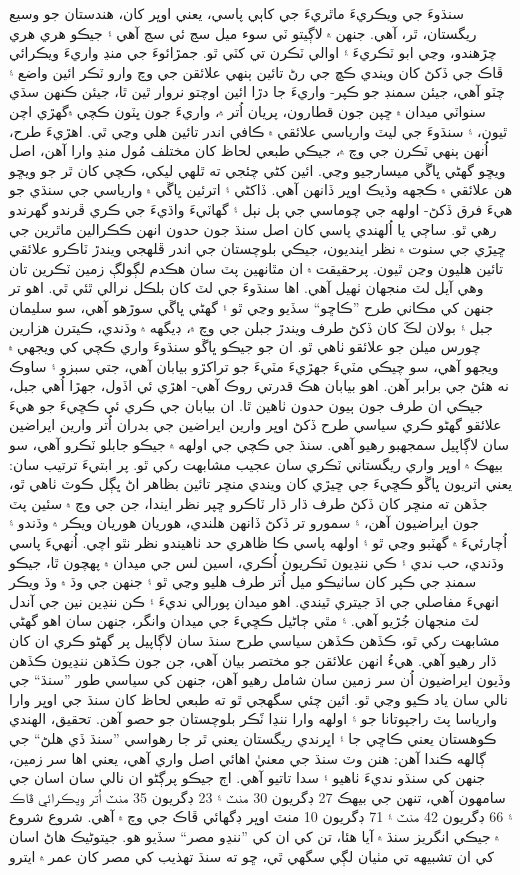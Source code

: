 \documentclass[a4paper]{article}
\begin{document}
\begin{flushright}
سنڌوءَ جي ويڪريءَ ماٿريءَ جي کاٻي پاسي، يعني اوڀر کان، هندستان جو وسيع ريگستان، ٿر، آهي. جنهن ۾ لاڳيتو ٽي سوء ميل سڃ ئي سڃ آهي ۽ جيڪو هري هري چڙهندو، وڃي ابو ٽڪريءَ ۽ اوالي ٽڪرن تي کٽي ٿو. جمڙائوءَ جي منڍ واريءَ ويڪرائي ڦاڪ جي ڏکڻ کان ويندي ڪڇ جي رڻ تائين ٻنهي علائقن جي وچ وارو ٽڪر ائين واضع ۽ چٽو آهي، جيئن سمنڊ جو ڪپر- واريءَ جا دڙا ائين اوچتو نروار ٿين ٿا، جيئن ڪنهن سڌي سنواٽي ميدان ۾ ڇپن جون قطارون، پريان اُتر ۾، واريءَ جون ڀٽون ڪچي ۾گهڙي اچن ٿيون، ۽ سنڌوءَ جي ليٽ وارياسي علائقي ۾ ڪافي اندر تائين هلي وڃي ٿي. اهڙيءَ طرح، اُنهن ٻنهي ٽڪرن جي وچ ۾، جيڪي طبعي لحاظ کان مختلف مُول منڍ وارا آهن، اصل ويڇو گهڻي ڀاڱي ميسارجيو وڃي. ائين کڻي چئجي ته ٿلهي ليکي، ڪچي کان ٿر جو ويڇو هن علائقي ۾ ڪجهه وڌيڪ اوڀر ڏانهن آهي. ڏاکڻي ۽ اترئين ڀاڱي ۾ وارياسي جي سنڌي جو هيءَ فرق ڏکڻ- اولهه جي چوماسي جي ٻل نٻل ۽ گهاٽيءَ واڌيءَ جي ڪري ڦرندو گهرندو رهي ٿو. ساڄي يا اُلهندي پاسي کان اصل سنڌ جون حدون انهن ڪڪرالين ماٿرين جي ڇيڙي جي سنوت ۾ نظر اينديون، جيڪي بلوچستان جي اندر ڦلهجي ويندڙ ٽاڪرو علائقي تائين هليون وڃن ٿيون. پرحقيقت ۾ ان مٿانهين پٽ سان هڪدم لڳولڳ زمين ٽڪرين تان وهي آيل لٽ منجهان ٺهيل آهي. اها سنڌوءَ جي لٽ کان بلڪل نرالي ٿئي ٿي. اهو تر جنهن کي مڪاني طرح ”ڪاڇو“ سڏيو وڃي ٿو ۽ گهڻي ڀاڱي سوڙهو آهي، سو سليمان جبل ۽ بولان لڪَ کان ڏکڻ طرف ويندڙ جبلن جي وچ ۾، ڊيگهه ۾ وڌندي، ڪيترن هزارين چورس ميلن جو علائقو ٺاهي ٿو. ان جو جيڪو ڀاڱو سنڌوءَ واري ڪچي کي ويجهي ۾ ويجهو آهي، سو چيڪي مٽيءَ جهڙيءَ مٽيءَ جو تراکڙو بيابان آهي، جتي سبزو ۽ ساوڪ نه هئڻ جي برابر آهن. اهو بيابان هڪ قدرتي روڪ آهي- اهڙي ئي اڏول، جهڙا اُهي جبل، جيڪي ان طرف جون ٻيون حدون ٺاهين ٿا. ان بيابان جي ڪري ئي ڪڇيءَ جو هيءَ علائقو گهڻو ڪري سياسي طرح ڏکڻ اوڀر وارين ايراضين جي بدران اُتر وارين ايراضين سان لاڳاپيل سمجهبو رهيو آهي. سنڌ جي ڪچي جي اولهه ۾ جيڪو جابلو ٽڪرو آهي، سو بيهڪ ۾ اوڀر واري ريگستاني ٽڪري سان عجيب مشابهت رکي ٿو. پر ابتيءَ ترتيب سان: يعني اتريون ڀاڱو ڪڇيءَ جي ڇيڙي کان ويندي منڇر تائين بظاهر اڻ ڀڳل ڪوٽ ٺاهي ٿو، جڏهن ته منڇر کان ڏکڻ طرف ڌار ڌار ٽاڪرو ڇپر نظر ايندا، جن جي وچ ۾ سئين پٽ جون ايراضيون آهن، ۽ سمورو تر ڏکڻ ڏانهن هلندي، هوريان هوريان ويڪر ۾ وڌندو ۽ اُچارئيءَ ۾ گهٽبو وڃي ٿو ۽ اولهه پاسي ڪا ظاهري حد ٺاهيندو نظر نٿو اچي. اُنهيءَ پاسي وڌندي، حب ندي ۽ ڪي ننڍيون ٽڪريون اُڪري، اسين لس جي ميدان ۾ پهچون ٿا، جيڪو سمنڊ جي ڪپر کان ساٺيڪو ميل اُتر طرف هليو وڃي ٿو ۽ جنهن جي وڌ ۾ وڌ ويڪر انهيءَ مفاصلي جي اڌ جيتري ٿيندي. اهو ميدان پورالي نديءَ ۽ ڪن ننڍين نين جي آندل لٽ منجهان جُڙيو آهي. ۽ مٿي ڄاڻيل ڪڇيءَ جي ميدان وانگر، جنهن سان اهو گهڻي مشابهت رکي ٿو، ڪڏهن ڪڏهن سياسي طرح سنڌ سان لاڳاپيل پر گهڻو ڪري ان کان ڌار رهيو آهي. هيءُ انهن علائقن جو مختصر بيان آهي، جن جون ڪڏهن ننڍيون ڪڏهن وڏيون ايراضيون اُن سر زمين سان شامل رهيو آهن، جنهن کي سياسي طور ”سنڌ“ جي نالي سان ياد ڪيو وڃي ٿو. ائين چئي سگهجي ٿو ته طبعي لحاظ کان سنڌ جي اوڀر وارا وارياسا پٽ راجپوتانا جو ۽ اولهه وارا ننڍا ٽَڪر بلوچستان جو حصو آهن. تحقيق، الهندي ڪوهستان يعني ڪاڇي جا ۽ اڀرندي ريگستان يعني ٿر جا رهواسي ”سنڌ ڏي هلڻ“ جي ڳالهه ڪندا آهن: هنن وٽ سنڌ جي معنيٰ اهائي اصل واري آهي، يعني اها سر زمين، جنهن کي سنڌو نديءَ ٺاهيو ۽ سدا تاتيو آهي. اڄ جيڪو پرڳڻو ان نالي سان اسان جي سامهون آهي، تنهن جي بيهڪ 27 ڊگريون 30 منٽ ۽ 23 ڊگريون 35 منٽ اُتر ويڪرائي ڦاڪ ۽ 66 ڊگريون 42 منٽ ۽ 71 ڊگريون 10 منٽ اوڀر ڊگهائي ڦاڪ جي وچ ۾ آهي. شروع شروع ۾ جيڪي انگريز سنڌ ۾ آيا هئا، تن کي ان کي ”ننڍو مصر“ سڏيو هو. جيتوڻيڪ هاڻ اسان کي ان تشبيهه تي مٺيان لڳي سگهي ٿي، ڇو ته سنڌ تهذيب کي مصر کان عمر ۾ ايترو 
\end{flushright}
\end{document}
